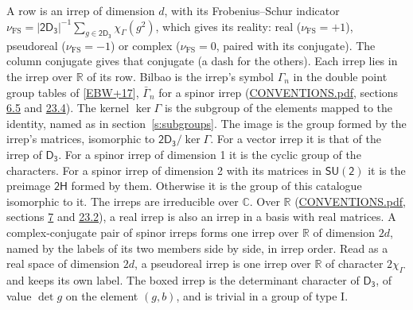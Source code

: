 \documentclass[10pt,a4paper]{article}
\numberwithin{equation}{section}
\newcommand{\grp}[1]{\mathsf{#1}}
\newcommand{\irchar}[1]{\chi_{#1}}
\newcommand{\fsind}{\nu_{\mathrm{FS}}}
\begin{document}
\leavevmode\label{n:index.frobenius}\label{n:head.irrep}\label{n:head.reality}A row is an irrep of dimension $d$, with its Frobenius--Schur indicator $\fsind = |\grp{2D_{3}}|^{-1}\allowbreak\sum_{g\in\grp{2D_{3}}}\irchar{\Gamma}(g^2)$, which gives its reality: real ($\fsind = +1$), pseudoreal ($\fsind = -1$) or complex ($\fsind = 0$, paired with its conjugate). \label{n:head.conjugate}The column conjugate gives that conjugate (a dash for the others). \label{n:head.over.real}Each irrep lies in the irrep over $\mathbb{R}$ of its row. \label{n:head.bilbao}\label{n:irrep.alias.gamma}Bilbao is the irrep's symbol $\Gamma_n$ in the double point group tables of [\href{../../../REFERENCES.pdf\#ref.EBW+17}{EBW+17}], $\bar{\Gamma}_n$ for a spinor irrep (\href{../../CONVENTIONS.pdf}{CONVENTIONS.pdf}, sections \href{../../../rotation/CONVENTIONS.pdf\#conv.6.5}{6.5} and \href{../../CONVENTIONS.pdf\#conv.23.4}{23.4}). \label{n:head.kernel}The kernel $\ker\Gamma$ is the subgroup of the elements mapped to the identity, named as in section~\ref{s:subgroups}. \label{n:head.image}The image is the group formed by the irrep's matrices, isomorphic to $\grp{2D_{3}}/\ker\Gamma$. For a vector irrep it is that of the irrep of \href{../../../rotation/data/pdf/D3.pdf}{$\grp{D_{3}}$}. For a spinor irrep of dimension 1 it is the cyclic group of the characters. For a spinor irrep of dimension 2 with its matrices in $\grp{SU(2)}$ it is the preimage $\grp{2H}$ formed by them. Otherwise it is the group of this catalogue isomorphic to it. The irreps are irreducible over $\mathbb{C}$. Over $\mathbb{R}$ (\href{../../CONVENTIONS.pdf}{CONVENTIONS.pdf}, sections \href{../../../rotation/CONVENTIONS.pdf\#conv.7}{7} and \href{../../CONVENTIONS.pdf\#conv.23.2}{23.2}), a real irrep is also an irrep in a basis with real matrices. A complex-conjugate pair of spinor irreps forms one irrep over $\mathbb{R}$ of dimension $2d$, named by the labels of its two members side by side, in irrep order. Read as a real space of dimension $2d$, a pseudoreal irrep is one irrep over $\mathbb{R}$ of character $2\irchar{\Gamma}$ and keeps its own label. \label{n:mark.determinant}The boxed irrep is the determinant character of \href{../../../rotation/data/pdf/D3.pdf}{$\grp{D_{3}}$}, of value $\det g$ on the element $(g, b)$, and is trivial in a group of type I.
\setlength{\emergencystretch}{2em}\par\setlength{\emergencystretch}{0pt}
\end{document}
